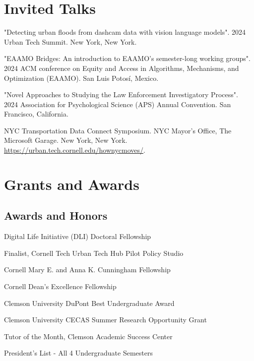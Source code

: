 \documentclass[11pt,letterpaper]{report}
\begin{document}
    \section*{Invited Talks}

    \begin{tablist}

        \item[2024.d] \tab{} "Detecting urban floods from dashcam data with vision language models". 2024 Urban Tech Summit. New York, New York. 

        \item[2024.c] \tab{} "EAAMO Bridges: An introduction to EAAMO’s semester-long working groups". 2024 ACM conference on Equity and Access in Algorithms, Mechanisms, and Optimization (EAAMO). San Luis Potosí, Mexico.

        \item[2024.b] \tab{} "Novel Approaches to Studying the Law Enforcement Investigatory Process". 2024 Association for Psychological Science (APS) Annual Convention.  San Francisco, California.

        \item[2024.a] \tab{} NYC Transportation Data Connect Symposium. NYC Mayor's Office, The Microsoft Garage. New York, New York. \href{https://urban.tech.cornell.edu/hownycmoves/}{https://urban.tech.cornell.edu/hownycmoves/}. 

    \end{tablist}
    
    \section*{Grants and Awards}

    \subsection*{Awards and Honors}

    \begin{tablist}
        \item[2024] \tab{}Digital Life Initiative (DLI) Doctoral Fellowship 
        \item[2024] \tab{}Finalist, Cornell Tech Urban Tech Hub Pilot Policy Studio 
        \item[2022] \tab{}Cornell Mary E. and Anna K. Cunningham Fellowship 
        \item[2022] \tab{}Cornell Dean's Excellence Fellowship 
        \item[2021] \tab{}Clemson University DuPont Best Undergraduate Award  
        \item[2021] \tab{}Clemson University CECAS Summer Research Opportunity Grant 
        \item[2020] \tab{}Tutor of the Month, Clemson Academic Success Center 
        \item[2019] \tab{}President's List - All 4 Undergraduate Semesters

    \end{tablist}
\end{document}
